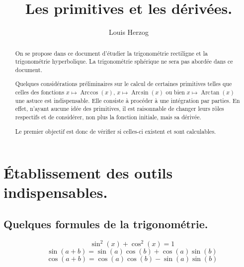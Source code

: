 \documentclass[a4paper,12pt]{report}
\newcommand{\sommaire}{\shorttoc{Sommaire}{1}}
\renewcommand{\arcsin}{\mathop{\mathrm{Arc\mspace{2mu}sin}}}
\renewcommand{\arccos}{\mathop{\mathrm{Arc\mspace{2mu}cos}}}
\renewcommand{\arctan}{\mathop{\mathrm{Arc\mspace{2mu}tan}}}
\begin{document}
 


\setlength{\parindent}{0pt}



\title{Les primitives et les dérivées.}
\date{}


\author{Louis Herzog} 

\maketitle 

\setcounter{tocdepth}{2}
\tableofcontents


\begin{abstract}
On se propose dans ce document d'étudier la trigonométrie rectiligne et la trigonométrie hyperbolique. La trigonométrie sphérique ne sera pas abordée dans ce document.

Quelques considérations préliminaires sur le calcul de certaines primitives telles que celles des fonctions 
 $x \mapsto \arccos(x) $,  $x \mapsto \arcsin(x) $ ou bien $x \mapsto \arctan(x) $ une astuce est indispensable. Elle consiste à procéder à une intégration par parties. En effet, n'ayant aucune idée des primitives, il est raisonnable de changer leurs rôles respectifs et de considérer, non plus la fonction initiale, mais sa dérivée.
 
Le premier objectif est donc de vérifier si celles-ci existent et sont calculables.


\end{abstract} 

\chapter{Établissement des outils indispensables.}
 
\section{Quelques formules de la trigonométrie.} 
\begin{equation} 
\quad \sin^2(x) + \cos^2(x)  = 1 
\end{equation}
\begin{equation} 
\quad \sin(a+b)  = \sin(a)\cos(b) + \cos(a)\sin(b) 
\end{equation}
\begin{equation} 
\quad \cos(a+b)  = \cos(a)\cos(b) - \sin(a)\sin(b)  
\end{equation}
\end{document}
